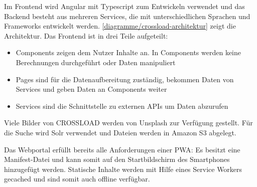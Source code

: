 Im Frontend wird Angular mit Typescript zum Entwickeln verwendet und das Backend besteht aus mehreren Services, die mit unterschiedlichen Sprachen und Frameworks entwickelt werden. \autoref{diagramme/crossload-architektur} zeigt die Architektur. Das Frontend ist in drei Teile aufgeteilt:
\begin{itemize}
\item Components zeigen dem Nutzer Inhalte an. In Components werden keine Berechnungen durchgeführt oder Daten manipuliert
\item Pages sind für die Datenaufbereitung zuständig, bekommen Daten von Services und geben Daten an Components weiter
\item Services sind die Schnittstelle zu externen \acp{API} um Daten abzurufen
\end{itemize}
Viele Bilder von CROSSLOAD werden von Unsplash zur Verfügung gestellt. Für die Suche wird Solr verwendet und Dateien werden in Amazon S3 abgelegt.


Das Webportal erfüllt bereits alle Anforderungen einer \ac{PWA}: Es besitzt eine Manifest-Datei und kann somit auf den Startbildschirm des Smartphones hinzugefügt werden. Statische Inhalte werden mit Hilfe eines Service Workers gecached und sind somit auch offline verfügbar. 


